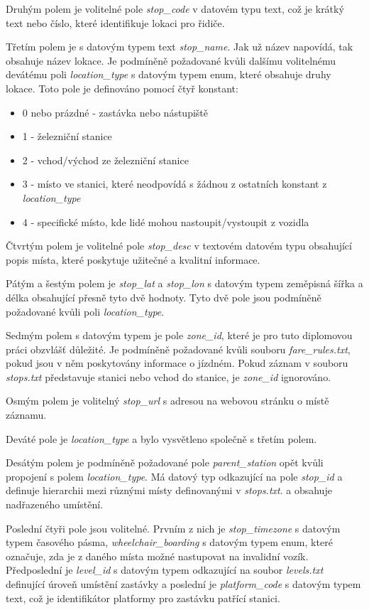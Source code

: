 Druhým polem je volitelné pole \textit{stop\_code} v datovém typu text, což je krátký text nebo číslo, 
které identifikuje lokaci pro řidiče. 

Třetím polem je s datovým typem text \textit{stop\_name}. Jak už název napovídá, tak obsahuje název lokace. 
Je podmíněně požadované kvůli dalšímu volitelnému devátému poli \textit{location\_type} s datovým typem enum, 
které obsahuje druhy lokace.
Toto pole je definováno pomocí čtyř konstant:
\begin{itemize} 
\item 0 nebo prázdné - zastávka nebo nástupiště
\item 1 - železniční stanice 
\item 2 - vchod/východ ze železniční stanice 
\item 3 - místo ve stanici, které neodpovídá s žádnou z ostatních konstant z \textit{location\_type} 
\item 4 - specifické místo, kde lidé mohou nastoupit/vystoupit z vozidla
\end{itemize}

Čtvrtým polem je volitelné pole \textit{stop\_desc} v textovém datovém typu obsahující popis místa, 
které poskytuje užitečné a kvalitní informace.

Pátým a šestým polem je \textit{stop\_lat} a \textit{stop\_lon} s datovým typem zeměpisná šířka a délka
obsahující přesně tyto dvě hodnoty. Tyto dvě pole jsou podmíněně požadované kvůli poli \textit{location\_type}.

Sedmým polem s datovým typem  je pole \textit{zone\_id}, které je pro tuto diplomovou práci obzvlášť důležité.
Je podmíněně požadované kvůli  souboru \textit{fare\_rules.txt}, pokud jsou v něm poskytovány informace o jízdném.
Pokud záznam v  souboru \textit{stops.txt} představuje stanici nebo vchod do stanice, je \textit{zone\_id} ignorováno.

Osmým polem je volitelný \textit{stop\_url} s  adresou na webovou stránku o místě záznamu.

Deváté pole je \textit{location\_type} a bylo vysvětleno společně s třetím polem.

Desátým polem je podmíněně požadované pole \textit{parent\_station} opět kvůli propojení s polem \textit{location\_type}.
Má datový typ  odkazující na pole \textit{stop\_id} a definuje hierarchii mezi různými místy definovanými v \textit{stops.txt}. 
a obsahuje  nadřazeného umístění.

Poslední čtyři pole jsou volitelné. Prvním z nich je \textit{stop\_timezone} s datovým typem časového pásma,
\textit{wheelchair\_boarding} s datovým typem enum, které označuje, zda je z daného místa možné nastupovat na invalidní vozík.
Předposlední je \textit{level\_id} s datovým typem  odkazující na soubor \textit{levels.txt} defi\-nující úroveň
umístění zastávky a poslední je \textit{platform\_code} s datovým typem text, 
což je identifikátor platformy pro zastávku patřící stanici.

